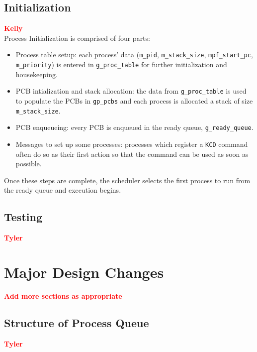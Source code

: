 \documentclass[12pt]{report}
\begin{document}
\section{Initialization}

\textcolor{red}{\textbf{Kelly}} \\

Process Initialization is comprised of four parts:
\begin{itemize}
	\item Process table setup: each process' data (\texttt{m_pid}, \texttt{m_stack_size},
		\texttt{mpf_start_pc}, \texttt{m_priority}) is entered in \texttt{g_proc_table}
		for further initialization and housekeeping.
	\item PCB intialization and stack allocation: the data from \texttt{g_proc_table}
		is used to populate the PCBs in \texttt{gp_pcbs} and each process is
		allocated a stack of size \texttt{m_stack_size}.
	\item PCB enqueueing: every PCB is enqueued in the ready queue, \texttt{g_ready_queue}.
	\item Messages to set up some processes: processes which register a \texttt{KCD}
		command often do so as their first action so that the command can be
		used as soon as possible.
\end{itemize}
Once these steps are complete, the scheduler selects the first process to run
from the ready queue and execution begins.


\section{Testing}

\textcolor{red}{\textbf{Tyler}} \\


\chapter{Major Design Changes}

\textcolor{red}{\textbf{Add more sections as appropriate}} \\

\section{Structure of Process Queue}

\textcolor{red}{\textbf{Tyler}} \\
\end{document}
